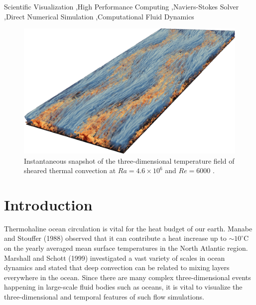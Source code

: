 \documentclass[5p,times]{elsarticle}
\begin{document}
\begin{frontmatter}
\begin{abstract}
\end{abstract}

\begin{keyword}

Scientific Visualization \sep High Performance Computing \sep Naviers-Stokes Solver \sep Direct Numerical Simulation \sep Computational Fluid Dynamics

\end{keyword}

\end{frontmatter}


\begin{figure}[!hbt]
	\centering
	\includegraphics[width=\linewidth]{flowfield}%
	\caption{\label{fig:flowfield} Instantaneous snapshot of the three-dimensional temperature field of sheared thermal convection at $ Ra=4.6 \times 10^6 $ and $ Re=6000 $ \cite{bla18}.}
\end{figure}

\section{Introduction}
\label{sec:Introduction}

Thermohaline ocean circulation \cite{rah00} is vital for the heat budget of our earth. Manabe and Stouffer (1988) \cite{man88} observed that it can contribute a heat increase up to $ \sim 10 ^ \circ $C on the yearly averaged mean surface temperatures in the North Atlantic region. Marshall and Schott (1999) \cite{mar99} investigated a vast variety of scales in ocean dynamics and stated that deep convection can be related to mixing layers everywhere in the ocean. Since there are many complex three-dimensional events happening in large-scale fluid bodies such as oceans, it is vital to visualize the three-dimensional and temporal features of such flow simulations.
\end{document}

